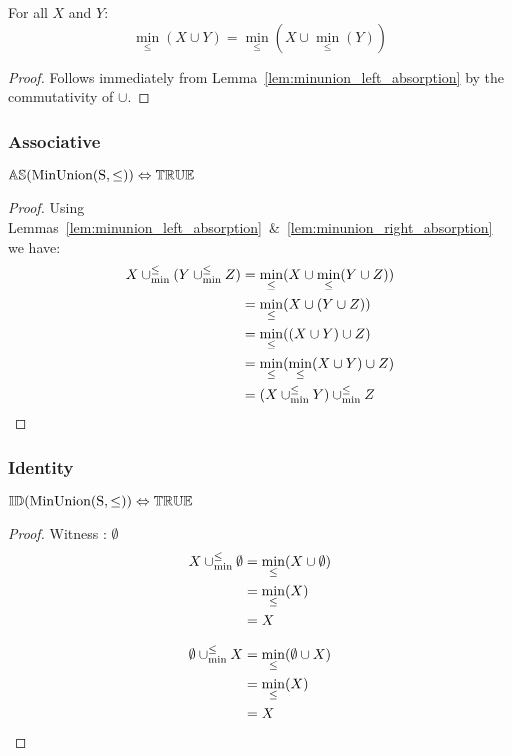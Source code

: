 \documentclass[../Summary.tex]{subfiles}
\begin{document}
\vspace{2em}


\begin{lemma} \label{lem:minunion_right_absorption}
For all $X$ and $Y$:
\begin{equation}
\min_\leq(X \cup Y) = \min_\leq(X \cup \min_\leq(Y))
\end{equation}
\end{lemma}

\begin{proof}
Follows immediately from Lemma~\ref{lem:minunion_left_absorption} by the commutativity of $\cup$.
\end{proof}



\subsubsection{Associative}

\begin{theorem} \label{thm:minunion_as}
${\mathbb{AS}}(\mathrm{MinUnion(S,\leq)}) \Leftrightarrow {\mathbb{TRUE}}$
\end{theorem}

\begin{proof}
Using Lemmas~\ref{lem:minunion_left_absorption}~\&~\ref{lem:minunion_right_absorption} we have:
\begin{align*}
X \mathbin{\cup_{\min}^{\leq}} (Y \mathbin{\cup_{\min}^{\leq}} Z) & = \min_\leq(X \cup \min_\leq(Y \cup Z)) \\
							& = \min_\leq(X \cup (Y \cup Z)) \\
							& = \min_\leq((X \cup Y) \cup Z) \\
							& = \min_\leq(\min_\leq(X \cup Y) \cup Z) \\
							& = (X \mathbin{\cup_{\min}^{\leq}} Y) \mathbin{\cup_{\min}^{\leq}} Z
\end{align*}
\end{proof}




\subsubsection{Identity}

\begin{theorem} \label{thm:minunion_id}
${\mathbb{ID}}(\mathrm{MinUnion(S,\leq)}) \Leftrightarrow {\mathbb{TRUE}}$
\end{theorem}

\begin{proof}
Witness : $\emptyset$
\begin{align*}
X \mathbin{\cup_{\min}^{\leq}} \emptyset 	& = \min_\leq(X \cup \emptyset) \\
						& = \min_\leq(X) \\
						& = X
\end{align*}

\begin{align*}
\emptyset \mathbin{\cup_{\min}^{\leq}} X 	& = \min_\leq(\emptyset \cup X) \\
						& = \min_\leq(X) \\
						& = X
\end{align*}
\end{proof}
\end{document}
